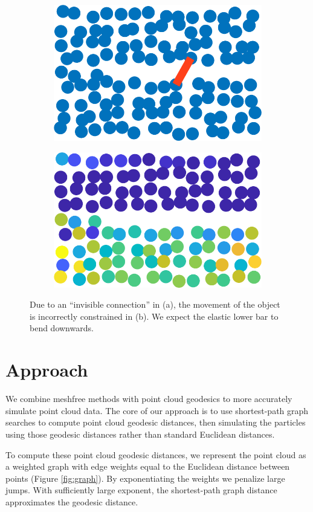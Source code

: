 \documentclass[11pt,a4paper, final, twoside]{article}
\theoremstyle{proposition}
\theoremstyle{definition}
\theoremstyle{remark}
\numberwithin{equation}{section}
\begin{document}
\begin{figure}[h]
\centering
\begin{subfigure}[t]{.5\textwidth}
  \centering
  \includegraphics[width=.7\linewidth]{jumpLine.png}
  \caption{}
\end{subfigure}%
\begin{subfigure}[t]{.5\textwidth}
  \centering
  \includegraphics[width=.7\linewidth]{pantsStay.png}
  \caption{}
\end{subfigure}
\caption{Due to an ``invisible connection'' in (a), the movement of the object is incorrectly constrained in (b). We expect the elastic lower bar to bend downwards.}
\label{fig:geoBad}
\end{figure}


\section{Approach}

We combine meshfree methods with point cloud geodesics to more accurately simulate point cloud data. The core of our approach is to use shortest-path graph searches to compute point cloud geodesic distances, then simulating the particles using those geodesic distances rather than standard Euclidean distances.

To compute these point cloud geodesic distances, we represent the point cloud as a weighted graph with edge weights equal to the Euclidean distance between points (Figure \ref{fig:graph}). By exponentiating the weights we penalize large jumps. With sufficiently large exponent, the shortest-path graph distance approximates the geodesic distance.
\end{document}
